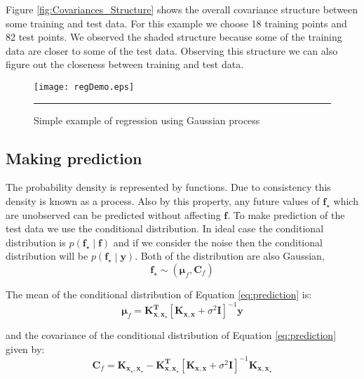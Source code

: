 Figure \ref{fig:Covariances_Structure} shows the overall covariance structure between some training and test data. For this example we choose 18 training points and 82 test points. We observed the shaded structure because some of the training data are closer to some of the test data. Observing this structure we can also figure out the closeness between training and test data. 

\begin{figure}
	\centering
		\texttt{[image: regDemo.eps]}
		\rule{35em}{0.5pt}
	\caption[Simple example of regression using Gaussian process]
		{Simple example of regression using Gaussian process}
	\label{fig:dempGPReg}
\end{figure}

\subsection{Making prediction}
The probability density is represented by functions. Due to consistency this density is known as a process. Also by this property, any future values of $\mathbf{f_\star}$ which are unobserved can be predicted without affecting $\mathbf{f}$. To make prediction of the test data we use the conditional distribution. In ideal case the conditional distribution is $ p\left( \mathbf{f_\star} \middle| \mathbf{f} \right) $ and if we consider the noise then the conditional distribution will be $ p\left( \mathbf{f_\star} \middle| \mathbf{y} \right) $. Both of the distribution are also Gaussian,
\begin{equation} \label{eq:prediction}
  \mathbf{f_\star}  \sim \left( \boldsymbol{\mu}_f, \mathbf{C}_f \right)
\end{equation}

The mean of the conditional distribution of Equation \ref{eq:prediction} is:
\begin{equation} \label{eq:prediction_mean}
  \boldsymbol{\mu}_f = \mathbf{K_{x,x_\star}^T} \left[ \mathbf{K_{x,x}}+ \sigma^2\mathbf{I} \right]^{-1} \mathbf{y}
\end{equation}

and the covariance of the conditional distribution of Equation \ref{eq:prediction} given by:
\begin{equation} \label{eq:prediction_cov}
  \mathbf{C}_f = \mathbf{K_{x_\star,x_\star}} -
		\mathbf{K_{x,x_\star}^T} \left[ \mathbf{K_{x,x}}+ \sigma^2\mathbf{I} \right]^{-1} \mathbf{K_{x,x_\star}}
\end{equation}

